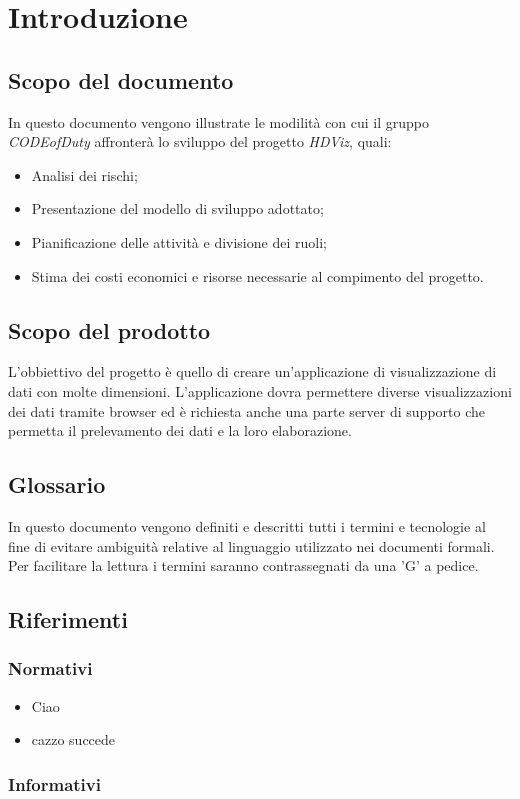 \section{Introduzione}
\subsection{Scopo del documento}
	In questo documento vengono illustrate le modilità con cui il gruppo \emph{CODEofDuty} affronterà lo sviluppo del progetto \emph{HDViz}, quali:
	\begin{itemize}
    		\item Analisi dei rischi;
    		\item Presentazione del modello di sviluppo adottato;
    		\item Pianificazione delle attività e divisione dei ruoli;
    		\item Stima dei costi economici e risorse necessarie al compimento del progetto.
	\end{itemize}
\subsection{Scopo del prodotto}
	L'obbiettivo del progetto è quello di creare un'applicazione di visualizzazione di dati con molte dimensioni. L'applicazione dovra permettere diverse visualizzazioni dei dati tramite browser ed è richiesta anche una parte server di supporto che permetta il prelevamento dei dati e la loro elaborazione.
\subsection{Glossario}
	In questo documento vengono definiti e descritti tutti i termini e tecnologie al fine di evitare ambiguità relative al linguaggio utilizzato nei documenti formali. Per facilitare la lettura i termini saranno contrassegnati da una 'G' a pedice.  
\subsection{Riferimenti}
	\subsubsection{Normativi}
		\begin{itemize}
			\item Ciao
			\item cazzo succede
		\end{itemize}
	\subsubsection{Informativi}